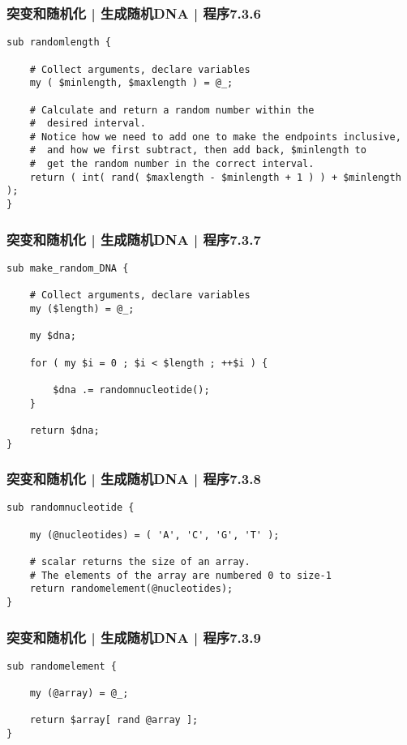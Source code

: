 \begin{frame}[fragile]
  \frametitle{突变和随机化 | 生成随机DNA | 程序7.3.6}
  \vspace{-1.5em}
\begin{lstlisting}[firstnumber=94,basicstyle=\small\tt]
sub randomlength {

    # Collect arguments, declare variables
    my ( $minlength, $maxlength ) = @_;

    # Calculate and return a random number within the
    #  desired interval.
    # Notice how we need to add one to make the endpoints inclusive,
    #  and how we first subtract, then add back, $minlength to
    #  get the random number in the correct interval.
    return ( int( rand( $maxlength - $minlength + 1 ) ) + $minlength );
}
\end{lstlisting}
\end{frame}

\begin{frame}[fragile]
  \frametitle{突变和随机化 | 生成随机DNA | 程序7.3.7}
  \vspace{-1.5em}
\begin{lstlisting}[firstnumber=114]
sub make_random_DNA {

    # Collect arguments, declare variables
    my ($length) = @_;

    my $dna;

    for ( my $i = 0 ; $i < $length ; ++$i ) {

        $dna .= randomnucleotide();
    }

    return $dna;
}
\end{lstlisting}
\end{frame}

\begin{frame}[fragile]
  \frametitle{突变和随机化 | 生成随机DNA | 程序7.3.8}
  \vspace{-1.5em}
\begin{lstlisting}[firstnumber=140]
sub randomnucleotide {

    my (@nucleotides) = ( 'A', 'C', 'G', 'T' );

    # scalar returns the size of an array.
    # The elements of the array are numbered 0 to size-1
    return randomelement(@nucleotides);
}
\end{lstlisting}
\end{frame}


\begin{frame}[fragile]
  \frametitle{突变和随机化 | 生成随机DNA | 程序7.3.9}
  \vspace{-1.5em}
\begin{lstlisting}[firstnumber=156]
sub randomelement {

    my (@array) = @_;

    return $array[ rand @array ];
}
\end{lstlisting}
\end{frame}


